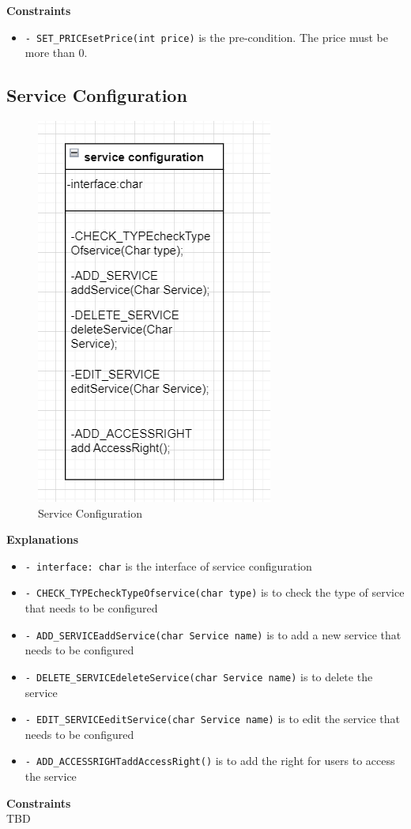 \textbf{Constraints} \\
\begin{itemize}
    \item \texttt{- SET\_PRICEsetPrice(int price)} is the pre-condition. The price must be more than 0.
\end{itemize}


\subsection{Service Configuration}
\begin{figure}[H]
    \centering
    \includegraphics[width=0.3\linewidth]{picture/3-4/3-4-2.png}
    \caption{Service Configuration}
    \label{fig:enter-label}
\end{figure}

\textbf{Explanations}
\begin{itemize}
    \item \texttt{- interface: char} is the interface of service configuration
    \item \texttt{- CHECK\_TYPEcheckTypeOfservice(char type)} is to check the type of service that needs to be configured
    \item \texttt{- ADD\_SERVICEaddService(char Service name)} is to add a new service that needs to be configured
    \item \texttt{- DELETE\_SERVICEdeleteService(char Service name)} is to delete the service
    \item \texttt{- EDIT\_SERVICEeditService(char Service name)} is to edit the service that needs to be configured
    \item \texttt{- ADD\_ACCESSRIGHTaddAccessRight()} is to add the right for users to access the service
\end{itemize}

\textbf{Constraints} \\
TBD


